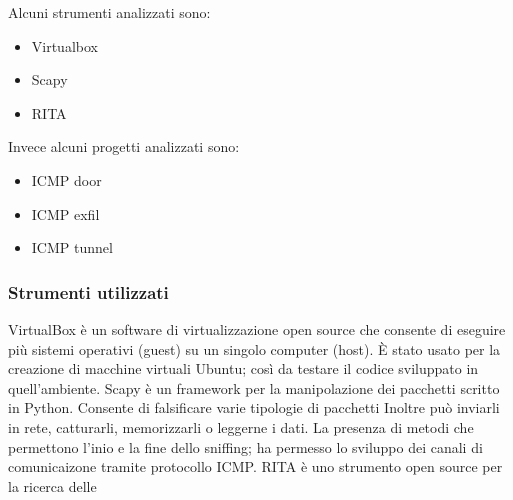 \begin{frame}
Alcuni strumenti analizzati sono: 
\begin{itemize} 
\item Virtualbox 
\item Scapy 
\item RITA 
\end{itemize}
Invece alcuni progetti analizzati sono: 
\begin{itemize} 
\item ICMP door 
\item ICMP exfil 
\item ICMP tunnel 
\end{itemize}
\end{frame}
%
\begin{frame}
\frametitle{Strumenti utilizzati}
VirtualBox è un software di virtualizzazione open source che consente di eseguire più sistemi operativi (guest) su un singolo computer (host). 
\MakeUppercase{è} stato usato per la creazione di macchine virtuali Ubuntu; così da testare il codice sviluppato in quell'ambiente. 
\vspace{1ex} \newline 
Scapy è un framework per la manipolazione dei pacchetti scritto in Python. 
Consente di falsificare varie tipologie di pacchetti %
Inoltre può inviarli in rete, catturarli, memorizzarli o leggerne i dati. 
La presenza di metodi che permettono l'inio e la fine dello sniffing; ha permesso lo sviluppo dei canali di comunicaizone tramite protocollo ICMP. 
\vspace{1ex} \newline  
RITA è uno strumento open source per la ricerca delle 

\end{frame}
